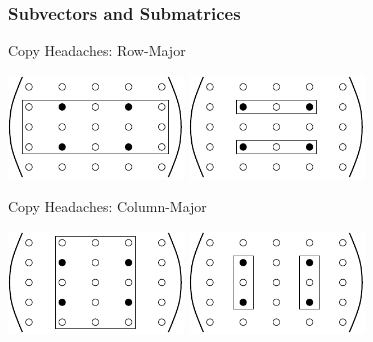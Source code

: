 \begin{frame}[fragile]
\frametitle{Subvectors and Submatrices}
 \begin{block}{Copy Headaches: Row-Major}
   \begin{center}
     \includegraphics[width=0.35\textwidth]{figs/copy-matrix-row-coarse.pdf} \hspace*{0.5cm}
     \includegraphics[width=0.35\textwidth]{figs/copy-matrix-row-fine.pdf}
   \end{center}
 \end{block}

 \begin{block}{Copy Headaches: Column-Major}
   \begin{center}
     \includegraphics[width=0.35\textwidth]{figs/copy-matrix-col-coarse.pdf} \hspace*{0.5cm}
     \includegraphics[width=0.35\textwidth]{figs/copy-matrix-col-fine.pdf}
   \end{center}
 \end{block}

\end{frame}





